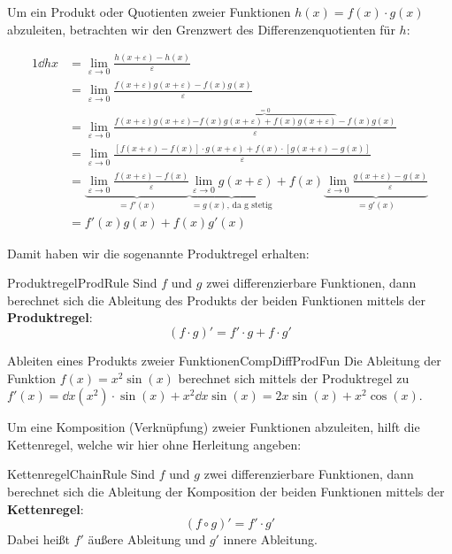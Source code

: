 Um ein Produkt oder Quotienten zweier Funktionen $h(x) = f(x) \cdot g(x)$ abzuleiten, betrachten wir den Grenzwert des Differenzenquotienten für $h$:

\begin{alignat*}{1}
    \dd{h}{x} &= \lim\limits_{\varepsilon\to 0} \frac{h(x+\varepsilon)-h(x)}{\varepsilon} \\
              &= \lim\limits_{\varepsilon \to 0} \frac{f(x+\varepsilon)g(x+\varepsilon)-f(x)g(x)}{\varepsilon} \\
               &= \lim\limits_{\varepsilon \to 0} \frac{f(x+\varepsilon)g(x+\varepsilon) \overbrace{-f(x)g(x+\varepsilon) + f(x)g(x+\varepsilon)}^{=0} - f(x)g(x)}{\varepsilon} \\
               &= \lim\limits_{\varepsilon \to 0} \frac{[f(x+\varepsilon)-f(x)]\cdot g(x+\varepsilon) + f(x) \cdot [g(x+\varepsilon) - g(x)]}{\varepsilon} \\
               &= \underbrace{\lim\limits_{\varepsilon \to 0} \frac{f(x+\varepsilon)-f(x)}{\varepsilon}}_{=f'(x)} \underbrace{\lim\limits_{\varepsilon\to 0} g(x+\varepsilon)}_{=g(x)\text{, da g stetig}} + f(x) \underbrace{\lim\limits_{\varepsilon \to 0} \frac{g(x+\varepsilon)-g(x)}{\varepsilon}}_{=g'(x)} \\
               &= f'(x)g(x) + f(x) g'(x)
\end{alignat*}

Damit haben wir die sogenannte Produktregel erhalten:

\begin{statement}{Produktregel}{ProdRule}
    Sind $f$ und $g$ zwei differenzierbare Funktionen, dann berechnet sich die Ableitung des Produkts der beiden Funktionen mittels der \textbf{Produktregel}:
    $$
        (f \cdot g)' = f' \cdot g + f \cdot g'
    $$
\end{statement}

\begin{example}{Ableiten eines Produkts zweier Funktionen}{CompDiffProdFun}
    Die Ableitung der Funktion $f(x) = x^2 \sin(x)$ berechnet sich mittels der Produktregel zu $f'(x) = \dd{}{x} (x^2) \cdot  \sin(x) + x^2 \dd{}{x} \sin(x) = 2x\sin(x) + x^2\cos(x)$.
\end{example}

Um eine Komposition (Verknüpfung) zweier Funktionen abzuleiten, hilft die Kettenregel, welche wir hier ohne Herleitung angeben:

\begin{statement}{Kettenregel}{ChainRule}
    Sind $f$ und $g$ zwei differenzierbare Funktionen, dann berechnet sich die Ableitung der Komposition der beiden Funktionen mittels der \textbf{Kettenregel}:
    $$
        (f \circ g)' = f' \cdot g'
    $$
    Dabei heißt $f'$ äußere Ableitung und $g'$ innere Ableitung.
\end{statement}

